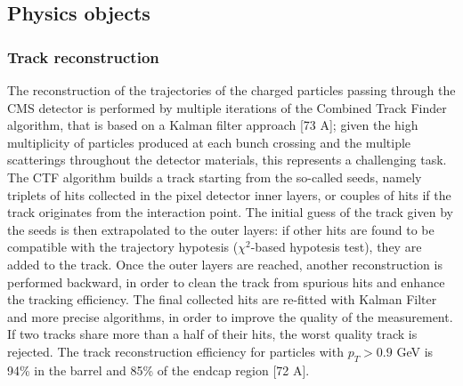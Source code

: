 \subsection{Physics objects}

\subsubsection{Track reconstruction}
The reconstruction of the trajectories of the charged particles passing through the CMS detector is performed by multiple iterations of the Combined Track Finder algorithm, that is based on a Kalman filter approach [73 A]; given the high multiplicity of particles produced at each bunch crossing and the multiple scatterings throughout the detector materials, this represents a challenging task. The CTF algorithm builds a track starting from the so-called seeds, namely triplets of hits collected in the pixel detector inner layers, or couples of hits if the track originates from the interaction point. The initial guess of the track given by the seeds is then extrapolated to the outer layers: if other hits are found to be compatible with the trajectory hypotesis ($\chi^2$-based hypotesis test), they are added to the track. Once the outer layers are reached, another reconstruction is performed backward, in order to clean the track from spurious hits and enhance the tracking efficiency. The final collected hits are re-fitted with Kalman Filter and more precise algorithms, in order to improve the quality of the measurement. If two tracks share more than a half of their hits, the worst quality track is rejected. The track reconstruction efficiency for particles with $p_T >0.9$ GeV is 94\% in the barrel and 85\% of the endcap region [72 A].\\
%

